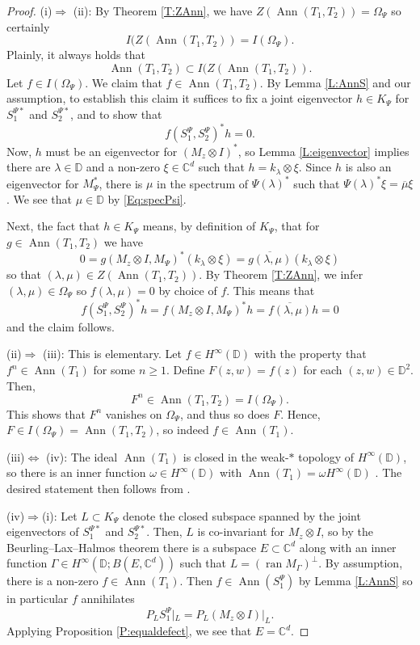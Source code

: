 \documentclass[10pt]{amsart}
\newcommand{\bC}{{\mathbb{C}}}
\newcommand{\bD}{{\mathbb{D}}}
\newcommand{\ol}{\overline}
\newcommand{\ran}{\operatorname{ran}}
\newcommand{\Ann}{\operatorname{Ann}}
\theoremstyle{definition}
\begin{document}
\begin{proof}
(i)$\Rightarrow$ (ii): By Theorem \ref{T:ZAnn}, we have $Z(\Ann(T_1,T_2))=\Omega_\Psi$ so certainly \[I(Z(\Ann(T_1,T_2))=I(\Omega_\Psi).\]
Plainly, it always holds that \[\Ann(T_1,T_2)\subset I(Z(\Ann(T_1,T_2)).
\]
Let $f\in I(\Omega_\Psi)$. We claim that $f\in \Ann(T_1,T_2)$. By Lemma \ref{L:AnnS} and our assumption, to establish this claim it suffices to fix a joint eigenvector  $h\in K_\Psi$ for $S_1^{\Psi *}$ and $S_2^{\Psi *}$, and to show that $$f(S^\Psi_1,S^\Psi_2)^* h=0.$$ Now, $h$ must be an eigenvector for $(M_z\otimes I)^*$, so Lemma \ref{L:eigenvector} implies there are $\lambda\in \bD$ and a non-zero $\xi\in \bC^d$ such that $h=k_\lambda\otimes \xi$. Since $h$ is also an eigenvector for $M_\Psi^*$, there is $\mu$ in the spectrum of $\Psi(\lambda)^*$ such that $\Psi(\lambda)^* \xi=\ol{\mu}\xi$.  We see that $\mu\in \bD$ by \eqref{Eq:specPsi}.

Next, the fact that $h\in K_\Psi$ means, by definition of $K_\Psi$, that for $g\in \Ann(T_1,T_2)$ we have
\[
0=g(M_z\otimes I, M_\Psi)^*(k_\lambda\otimes \xi)=\ol{g(\lambda,\mu)}(k_\lambda\otimes \xi)
\]
so that $(\lambda,\mu)\in Z(\Ann(T_1,T_2))$. By Theorem \ref{T:ZAnn}, we infer $(\lambda,\mu)\in \Omega_\Psi$ so $f(\lambda,\mu)=0$ by choice of $f$. This means that
\[
f(S^\Psi_1,S^\Psi_2)^* h=f(M_z\otimes I,M_\Psi)^* h=\ol{f(\lambda,\mu)}h=0
\]
and the claim follows.

(ii)$\Rightarrow$ (iii): This is elementary. Let $f\in H^\infty(\bD)$ with the property that $f^n\in \Ann(T_1)$ for some $n\geq 1$. Define $F(z,w)=f(z)$ for each $(z,w)\in \bD^2$. Then, $$F^n\in \Ann(T_1,T_2)=I(\Omega_\Psi).$$ This shows that $F^n$ vanishes on $\Omega_\Psi$, and thus so does $F$. Hence, $F\in I(\Omega_\Psi)=\Ann(T_1,T_2)$, so indeed $f\in \Ann(T_1)$. 

(iii)$\Leftrightarrow$ (iv): The ideal $\Ann(T_1)$ is closed in the weak-$*$ topology of $H^\infty(\bD)$, so there is an inner function $\omega\in H^\infty(\bD)$ with $\Ann(T_1)=\omega H^\infty(\bD)$ \cite{bercovici1988}. The desired statement then follows from \cite[Theorem 4.2]{clouatre2015CB}.

(iv)$\Rightarrow$(i): Let $L\subset K_\Psi$ denote the closed subspace spanned by the joint eigenvectors of $S_1^{\Psi *}$ and $S_2^{\Psi *}$. Then, $L$ is co-invariant for $M_z\otimes I$, so by the Beurling--Lax--Halmos theorem there is a subspace $E\subset \bC^d$ along with an inner function $\Gamma\in H^\infty(\bD;B(E,\bC^d))$ such that $L=(\ran M_\Gamma)^\perp$. By assumption, there is a non-zero $f\in \Ann(T_1)$. Then $f\in \Ann(S^\Psi_1)$ by Lemma \ref{L:AnnS} so in particular $f$ annihilates 
$$P_L S_1^\Psi|_L=P_L (M_z\otimes I)|_L.$$ Applying Proposition \ref{P:equaldefect}, we see that $E=\bC^d$.


\end{proof}
\end{document}
